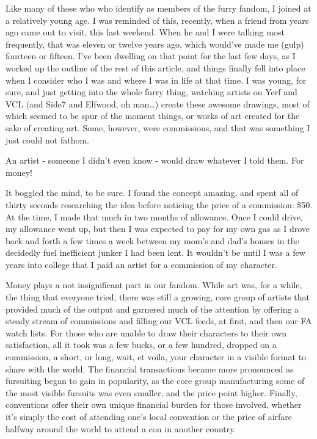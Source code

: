 
Like many of those who who identify as members of the furry fandom, I joined at a relatively young age. I was reminded of this, recently, when a friend from years ago came out to visit, this last weekend. When he and I were talking most frequently, that was eleven or twelve years ago, which would've made me (gulp) fourteen or fifteen. I've been dwelling on that point for the last few days, as I worked up the outline of the rest of this article, and things finally fell into place when I consider who I was and where I was in life at that time. I was young, for sure, and just getting into the whole furry thing, watching artists on Yerf and VCL (and Side7 and Elfwood, oh man\ldots{}) create these awesome drawings, most of which seemed to be spur of the moment things, or works of art created for the sake of creating art. Some, however, were commissions, and that was something I just could not fathom.

An artist - someone I didn't even know - would draw whatever I told them. For money!

It boggled the mind, to be sure. I found the concept amazing, and spent all of thirty seconds researching the idea before noticing the price of a commission: \$50. At the time, I made that much in two months of allowance. Once I could drive, my allowance went up, but then I was expected to pay for my own gas as I drove back and forth a few times a week between my mom's and dad's houses in the decidedly fuel inefficient junker I had been lent. It wouldn't be until I was a few years into college that I paid an artist for a commission of my character.

Money plays a not insignificant part in our fandom. While art was, for a while, the thing that everyone tried, there was still a growing, core group of artists that provided much of the output and garnered much of the attention by offering a steady stream of commissions and filling our VCL feeds, at first, and then our FA watch lists. For those who are unable to draw their characters to their own satisfaction, all it took was a few bucks, or a few hundred, dropped on a commission, a short, or long, wait, et voila, your character in a visible format to share with the world. The financial transactions became more pronounced as fursuiting began to gain in popularity, as the core group manufacturing some of the most visible fursuits was even smaller, and the price point higher. Finally, conventions offer their own unique financial burden for those involved, whether it's simply the cost of attending one's local convention or the price of airfare halfway around the world to attend a con in another country.

